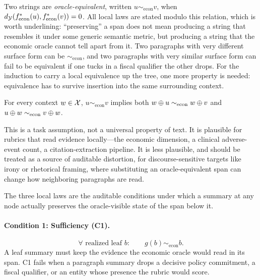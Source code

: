 Two strings are \emph{oracle-equivalent}, written
$u \sim_{\mathrm{econ}} v$, when
$d_{\mathcal{Y}}(f^\ast_{\mathrm{econ}}(u), f^\ast_{\mathrm{econ}}(v)) = 0$. All
local laws are stated modulo this relation, which is worth underlining:
``preserving'' a span does not mean producing a string that resembles it
under some generic semantic metric, but producing a string that the
economic oracle cannot tell apart from it. Two paragraphs with very
different surface form can be $\sim_{\mathrm{econ}}$, and two paragraphs
with very similar surface form can fail to be equivalent if one tucks in
a fiscal qualifier the other drops. For the induction to carry a local
equivalence up the tree, one more property is needed: equivalence has to
survive insertion into the same surrounding context.

\begin{assumption}\label{ass:context}
For every context $w \in \mathcal{X}$, $u \sim_{\mathrm{econ}} v$ implies
both $w \oplus u \sim_{\mathrm{econ}} w \oplus v$ and
$u \oplus w \sim_{\mathrm{econ}} v \oplus w$.
\end{assumption}

This is a task assumption, not a universal property of text. It is
plausible for rubrics that read evidence locally---the economic dimension,
a clinical adverse-event count, a citation-extraction pipeline. It is less
plausible, and should be treated as a source of auditable distortion, for
discourse-sensitive targets like irony or rhetorical framing, where
substituting an oracle-equivalent span can change how neighboring
paragraphs are read.

The three local laws are the auditable conditions under which a summary at
any node actually preserves the oracle-visible state of the span below it.

\paragraph{Condition 1: Sufficiency (C1).}
\begin{equation}\tag{C1}\label{eq:leaf_sufficiency}
    \forall\text{ realized leaf } b : \qquad
    g(b) \sim_{\mathrm{econ}} b.
\end{equation}
A leaf summary must keep the evidence the economic oracle would read in
its span. C1 fails when a paragraph summary drops a decisive policy
commitment, a fiscal qualifier, or an entity whose presence the rubric
would score.

